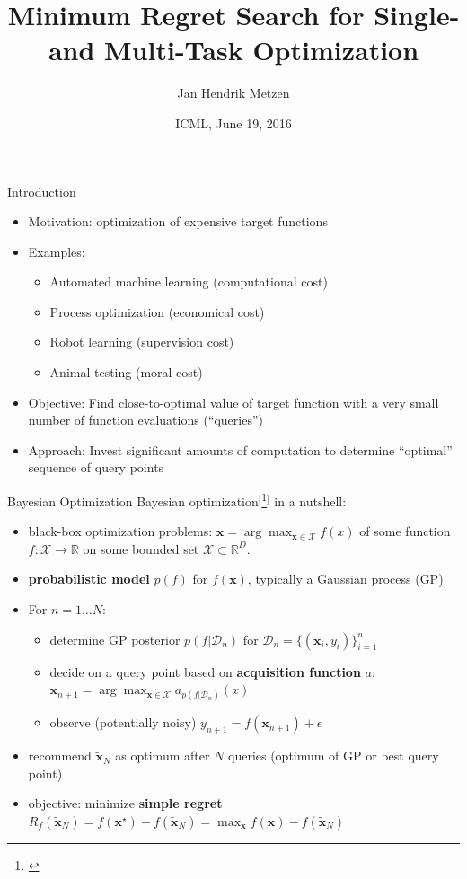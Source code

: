 \documentclass[11pt]{beamer}
\title[ICML 2016]{Minimum Regret Search for Single- and Multi-Task Optimization}
\author[Jan Hendrik Metzen]{Jan Hendrik Metzen}
\institute[]{University Bremen, Robotics Research Group \\ Robert Bosch GmbH, Corporate Research CR/AEY2}
\date[06/19/16]{ICML, June 19, 2016}
\newcommand{\footcite}[1]{$^[$\footnote{\begin{tiny}\bibentry{#1}\end{tiny}}$^]$}
\renewcommand{\emph}[1]{\textbf{#1}}
\begin{document}

\begin{frame}{Introduction}

\begin{itemize}
  \item Motivation: optimization of expensive target functions
  \item Examples:
  \begin{itemize}
    \item Automated machine learning (computational cost)
    \item Process optimization (economical cost)
    \item Robot learning (supervision cost)
    \item Animal testing (moral cost)
  \end{itemize}
  \pause
  \item Objective: Find close-to-optimal value of target function with a very small number of function evaluations (``queries'')
  \pause
   \item Approach: Invest significant amounts of computation to determine ``optimal'' sequence of query points
\end{itemize}
\vspace*{4cm}
\end{frame}

\begin{frame}{Bayesian Optimization}
Bayesian optimization\footcite{shahriari_taking_2016} in a nutshell:
\begin{itemize}
\item black-box optimization problems: $\mathbf{x} = \arg\max_{\mathbf{x} \in \mathcal{X}} f(x)$ of some function $f: \mathcal{X} \to \mathbb{R}$ on some bounded set $\mathcal{X} \subset \mathbb{R}^D$.
\item \emph{probabilistic model} $p(f)$ for $f(\mathbf{x})$, typically a Gaussian process (GP)
\pause
\item For $n=1\dots N$:
\begin{itemize}
   \item determine GP posterior $p(f\vert \mathcal{D}_n)$ for $\mathcal{D}_n=\{(\mathbf{x}_i, y_i)\}_{i=1}^n$ 
   \item decide on a query point based on \emph{acquisition function} $a$: $\mathbf{x}_{n+1} = \arg\max_{\mathbf{x} \in \mathcal{X}} a_{p(f\vert \mathcal{D}_n)}(x) $
\item observe (potentially noisy) $y_{n+1} = f(\mathbf{x}_{n+1}) + \epsilon$
\end{itemize}
\pause
\item recommend $\mathbf{\tilde x}_N$ as optimum  after $N$ queries (optimum of GP or best query point)
\item objective: minimize \emph{simple regret} 
$R_f(\mathbf{\tilde  x}_N) = f(\mathbf{x}^\star) - f(\mathbf{\tilde  x}_N) = \max_{\mathbf{x}} f(\mathbf{x}) - f(\mathbf{\tilde x}_N)$
\end{itemize}
\vspace*{2cm}
\end{frame}
\end{document}
